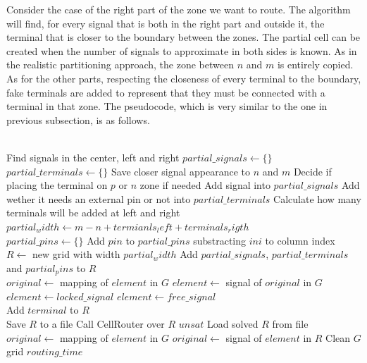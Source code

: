 Consider the case of the right part of the zone we want to route. The algorithm will find, for every signal that is both in the right part and outside it, the terminal that is closer to the boundary between the zones. The partial cell can be created when the number of signals to approximate in both sides is known. As in the realistic partitioning approach, the zone between $n$ and $m$ is entirely copied. As for the other parts, respecting the closeness of every terminal to the boundary, fake terminals are added to represent that they must be connected with a terminal in that zone. The pseudocode, which is very similar to the one in previous subsection, is as follows. \\

\small
\begin{algorithmic}
 \\
\State Find signals in the center, left and right
\State $partial\_signals \gets \{\}$
\State $partial\_terminals \gets \{\}$
		\State Save closer signal appearance to $n$ and $m$
		\State Decide if placing the terminal on $p$ or $n$ zone if needed
	\EndIf
		\State Add signal into $partial\_signals$
		\State Add wether it needs an external pin or not into $partial\_terminals$
	\EndIf
\EndFor 
\State Calculate how many terminals will be added at left and right
\State $partial_width \gets m - n + termianls_left + terminals_rigth$ \\

\State $partial\_pins \gets \{\}$
		\State Add $pin$ to $partial\_pins$ substracting $ini$ to column index
	\EndIf
\EndFor \\

\State $R \gets$ new grid with width $partial_width$ 
\State Add $partial\_signals$, $partial\_terminals$ and $partial_pins$ to $R$ \\

	\State $original \gets$ mapping of $element$ in $G$ 
		\State $element \gets $ signal of $original$ in $G$
		\State $element \gets locked\_signal$ 
	\Else
		\State $element \gets free\_signal$
	\EndIf
\EndFor \\

	\State Add $terminal$ to $R$
\EndFor \\

\State Save $R$ to a file
\State Call CellRouter over $R$
		\State \Return $unsat$
\EndIf
\State Load solved $R$ from file \\

	\State $original \gets$ mapping of $element$ in $G$ 
		\State $original \gets $ signal of $element$ in $R$
	\EndIf
\EndFor
\State Clean $G$ grid  
\State \Return $routing\_time$ \\
\EndFunction
\end{algorithmic} 
